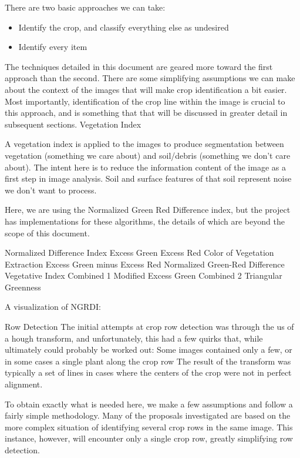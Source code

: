\documentclass[letterpaper]{article}
\begin{document}
There are two basic approaches we can take:
\begin{itemize}
	\item{Identify the crop, and classify everything else as undesired}
	\item{Identify every item}
\end{itemize}

The techniques detailed in this document are geared more toward the first approach than the second. There are some simplifying assumptions we can make about the context of the images that will make crop identification a bit easier. Most importantly, identification of the crop line within the image is crucial to this approach, and is something that that will be discussed in greater detail in subsequent sections.
Vegetation Index

A vegetation index is applied to the images to produce segmentation between vegetation (something we care about) and soil/debris (something we don’t care about). The intent here is to reduce the information content of the image as a first step in image analysis. Soil and surface features of that soil represent noise we don’t want to process.

Here, we are using the Normalized Green Red Difference index, but the project has implementations for these algorithms, the details of which are beyond the scope of this document.

Normalized Difference Index
Excess Green
Excess Red
Color of Vegetation Extraction
Excess Green minus Excess Red
Normalized Green-Red Difference
Vegetative Index
Combined 1
Modified Excess Green
Combined 2
Triangular Greenness 


A visualization of NGRDI:



Row Detection
The initial attempts at crop row detection was through the us of a hough transform, and unfortunately, this had a few quirks that, while ultimately could probably be worked out:
Some images contained only a few, or in some cases a single plant along the crop row
The result of the transform was typically a set of lines in cases where the centers of the crop were not in perfect alignment.

To obtain exactly what is needed here, we make a few assumptions and follow a fairly simple methodology. Many of the proposals investigated are based on the more complex situation of identifying several crop rows in the same image. This instance, however, will encounter only a single crop row, greatly simplifying row detection.
\end{document}
